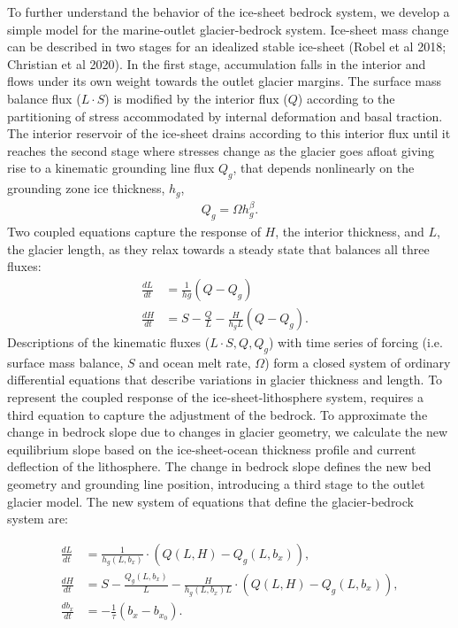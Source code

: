 \documentclass[tc, manuscript]{copernicus}
\begin{document}
To further understand the behavior of the ice-sheet bedrock system, we develop a simple model for the marine-outlet glacier-bedrock system.
Ice-sheet mass change can be described in two stages for an idealized stable ice-sheet (Robel et al 2018; Christian et al 2020).
In the first stage, accumulation falls in the interior and flows under its own weight towards the outlet glacier margins.
The surface mass balance flux ($L\cdot S$) is modified by the interior flux ($Q$) according to the partitioning of stress accommodated by internal deformation and basal traction.
The interior reservoir of the ice-sheet drains according to this interior flux until it reaches the second stage where stresses change as the glacier goes afloat giving rise to a kinematic grounding line flux $Q_g$, that depends nonlinearly on the grounding zone ice thickness, $h_g$,
\begin{align}
Q_g=\Omega h_g^\beta.
\end{align}
 Two coupled equations capture the response of $H$, the interior thickness, and $L$, the glacier length, as they relax towards a steady state that balances all three fluxes:
 \begin{align}
 \frac{dL}{dt} &=\frac{1}{hg}(Q-Q_g) \\
\frac{dH}{dt} &=S - \frac{Q}{L}-\frac{H}{h_g L}(Q-Q_g).& 
\end{align}
Descriptions of the kinematic fluxes ($L\cdot S, Q, Q_g$) with time series of forcing (i.e. surface mass balance, $S$ and ocean melt rate, $\Omega$) form a closed system of ordinary differential equations that describe variations in glacier thickness and length. 
To represent the coupled response of the ice-sheet-lithosphere system, requires a third equation to capture the adjustment of the bedrock.
To approximate the change in bedrock slope due to changes in glacier geometry, we calculate the new equilibrium slope based on the ice-sheet-ocean thickness profile and current deflection of the lithosphere. 
The change in bedrock slope defines the new bed geometry and grounding line position, introducing a third stage to the outlet glacier model.
The new system of equations that define the glacier-bedrock system are:

\begin{align}
    \frac{dL}{dt} & = \frac{1}{h_g(L,b_x)}\cdot(Q(L,H)-Q_g(L,b_x)), \\
    \frac{dH}{dt} & = S-\frac{Q_g(L,b_x)}{L}-\frac{H}{h_g(L,b_x) L} \cdot (Q(L,H)-Q_g(L,b_x)), \\
    \frac{db_x}{dt} & = -\frac{1}{\tau}(b_x - b_{x_0}).
\end{align}
\end{document}
